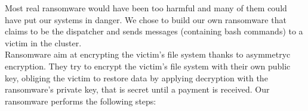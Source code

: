 \noindent Most real ransomware would have been too harmful and many of them could have put our systems in danger. We chose to build our own ransomware that claims to be the dispatcher and sends messages (containing bash commands) to a victim in the cluster. \\
Ransomware aim at encrypting the victim's file system thanks to asymmetryc encryption. They try to encrypt the victim's file system with their own public key, obliging the victim to restore data by applying decryption with the ransomware's private key, that is secret until a payment is received.
Our ransomware performs the following steps:


